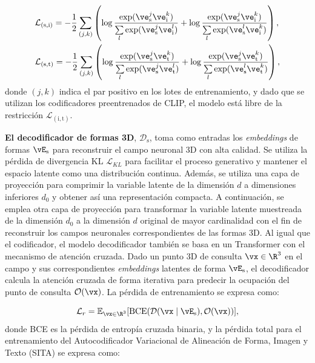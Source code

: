 \documentclass[../../book-main_es.tex]{subfiles}
\begin{document}
\begin{align}
    &\mathcal{L}_{(\mathrm{s},\mathrm{i})} = - \frac{1}{2} \sum\limits_{(j,k)}
    \left(
        \log \frac{\exp (\ve_{\mathrm{s}}^j \ve_{\mathrm{i}}^k) }{
        \sum\limits_l \exp (\ve_{\mathrm{s}}^j \ve_{\mathrm{i}}^l) } +
        \log \frac{\exp (\ve_{\mathrm{s}}^j \ve_{\mathrm{i}}^k) }{
        \sum\limits_l \exp (\ve_{\mathrm{s}}^l \ve_{\mathrm{i}}^k) }
    \right), \\
    &\mathcal{L}_{(\mathrm{s},\mathrm{t})}  = - \frac{1}{2} \sum\limits_{(j,k)}
    \left(
        \log \frac{\exp (\ve_{\mathrm{s}}^j \ve_{\mathrm{t}}^k) }{
        \sum\limits_l \exp (\ve_{\mathrm{s}}^j \ve_{\mathrm{t}}^l) } +
        \log \frac{\exp (\ve_{\mathrm{s}}^j \ve_{\mathrm{t}}^k) }{
        \sum\limits_l \exp (\ve_{\mathrm{s}}^l \ve_{\mathrm{t}}^k) }
    \right),
\end{align}
donde $(j,k)$ indica el par positivo en los lotes de entrenamiento, y
dado que se utilizan los codificadores preentrenados de CLIP, el modelo está libre
de la restricción $\mathcal{L}_{(\mathrm{i}, \mathrm{t})}$.

\textbf{El decodificador de formas 3D}, $\mathcal{D}_{\mathrm{s}}$, toma como entradas los
\textit{embeddings} de formas $\vE_{\mathrm{s}}$ para reconstruir el campo neuronal 3D
con alta calidad. Se utiliza la pérdida de divergencia KL
$\mathcal{L}_{KL}$ para facilitar el proceso generativo y
mantener el espacio latente como una distribución continua.
Además, se utiliza una capa de proyección para comprimir la variable latente de
la dimensión $d$ a dimensiones inferiores $d_0$ y obtener así una representación compacta.
A continuación, se emplea otra capa de proyección para transformar la variable latente
muestreada de la dimensión $d_0$ a la dimensión $d$ original de mayor cardinalidad con el fin de
reconstruir los campos neuronales correspondientes de las formas 3D.
Al igual que el codificador, el modelo decodificador también se basa en un Transformer con el
mecanismo de atención cruzada. Dado un punto 3D de consulta $\vx \in \R^{3}$ en el campo
y sus correspondientes \textit{embeddings} latentes de forma $\vE_{\mathrm{s}}$, el decodificador
calcula la atención cruzada de forma iterativa para predecir la ocupación del punto de consulta
$\mathcal{O} (\vx)$. La pérdida de entrenamiento se expresa como:

\begin{equation}
\mathcal{L}_r = \mathbb{E}_{\vx \in \R^3} [\text{BCE}(
\mathcal{D}(\vx \mid \vE_{\mathrm{s}} ), \mathcal{O}(\vx) )],
\end{equation}
donde BCE es la pérdida de entropía cruzada binaria, y la pérdida total para
el entrenamiento del Autocodificador Variacional de Alineación de Forma, Imagen y Texto (SITA) se expresa como:
\end{document}
